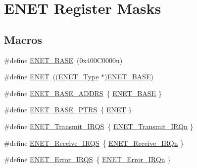 \hypertarget{group___e_n_e_t___register___masks}{}\section{E\+N\+ET Register Masks}
\label{group___e_n_e_t___register___masks}
\subsection*{Macros}
\begin{DoxyCompactItemize}
\item 
\#define \mbox{\hyperlink{group___e_n_e_t___register___masks_gac68335c7b2279435944fe8e837aeb697}{E\+N\+E\+T\+\_\+\+B\+A\+SE}}~(0x400\+C0000u)
\item 
\#define \mbox{\hyperlink{group___e_n_e_t___register___masks_ga4745105f505f3ab949d6a57fbe2a0ed5}{E\+N\+ET}}~((\mbox{\hyperlink{struct_e_n_e_t___type}{E\+N\+E\+T\+\_\+\+Type}} $\ast$)\mbox{\hyperlink{group___e_n_e_t___register___masks_gac68335c7b2279435944fe8e837aeb697}{E\+N\+E\+T\+\_\+\+B\+A\+SE}})
\item 
\#define \mbox{\hyperlink{group___e_n_e_t___register___masks_ga14e5c3d5659dcf8b2cbc967aa645729e}{E\+N\+E\+T\+\_\+\+B\+A\+S\+E\+\_\+\+A\+D\+D\+RS}}~\{ \mbox{\hyperlink{group___e_n_e_t___register___masks_gac68335c7b2279435944fe8e837aeb697}{E\+N\+E\+T\+\_\+\+B\+A\+SE}} \}
\item 
\#define \mbox{\hyperlink{group___e_n_e_t___register___masks_gaa42b0a3bb4d738c4d78a36663b481ff8}{E\+N\+E\+T\+\_\+\+B\+A\+S\+E\+\_\+\+P\+T\+RS}}~\{ \mbox{\hyperlink{group___e_n_e_t___register___masks_ga4745105f505f3ab949d6a57fbe2a0ed5}{E\+N\+ET}} \}
\item 
\#define \mbox{\hyperlink{group___e_n_e_t___register___masks_ga42cb25446e48980b81b282094208c238}{E\+N\+E\+T\+\_\+\+Transmit\+\_\+\+I\+R\+QS}}~\{ \mbox{\hyperlink{group___interrupt__vector__numbers_gga666eb0caeb12ec0e281415592ae89083ac4e6005822fd23a07b3f8f21833ec274}{E\+N\+E\+T\+\_\+\+Transmit\+\_\+\+I\+R\+Qn}} \}
\item 
\#define \mbox{\hyperlink{group___e_n_e_t___register___masks_gab36042e83748d6b2571e171505777929}{E\+N\+E\+T\+\_\+\+Receive\+\_\+\+I\+R\+QS}}~\{ \mbox{\hyperlink{group___interrupt__vector__numbers_gga666eb0caeb12ec0e281415592ae89083a870426305ade1c60a291777a76b17021}{E\+N\+E\+T\+\_\+\+Receive\+\_\+\+I\+R\+Qn}} \}
\item 
\#define \mbox{\hyperlink{group___e_n_e_t___register___masks_gaab04717ea6cc2c2ad897665e7865fae5}{E\+N\+E\+T\+\_\+\+Error\+\_\+\+I\+R\+QS}}~\{ \mbox{\hyperlink{group___interrupt__vector__numbers_gga666eb0caeb12ec0e281415592ae89083ab6f067a315d7c97896d189b1c62c763e}{E\+N\+E\+T\+\_\+\+Error\+\_\+\+I\+R\+Qn}} \}

\end{DoxyCompactItemize}
